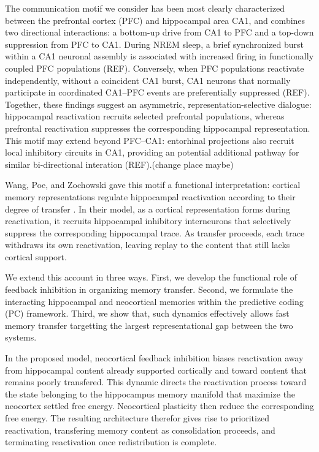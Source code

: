\documentclass[10pt,letterpaper]{article}
\theoremstyle{plain}
\theoremstyle{remark}
\begin{document}
The communication motif we consider has been most clearly characterized between the prefrontal cortex (PFC) and hippocampal area CA1, and combines two directional interactions: a bottom-up drive from CA1 to PFC and a top-down suppression from PFC to CA1. During NREM sleep, a brief synchronized burst within a CA1 neuronal assembly is associated with increased firing in functionally coupled PFC populations (REF). Conversely, when PFC populations reactivate independently, without a coincident CA1 burst, CA1 neurons that normally participate in coordinated CA1–PFC events are preferentially suppressed (REF). Together, these findings suggest an asymmetric, representation-selective dialogue: hippocampal reactivation recruits selected prefrontal populations, whereas prefrontal reactivation suppresses the corresponding hippocampal representation. This motif may extend beyond PFC–CA1: entorhinal projections also recruit local inhibitory circuits in CA1, providing an potential additional pathway for similar bi-directional interation (REF).(change place maybe)

Wang, Poe, and Zochowski gave this motif a functional interpretation: cortical memory representations regulate hippocampal reactivation according to their degree of transfer \cite{wang2008heterogeneities}. In their model, as a cortical representation forms during reactivation, it recruits hippocampal inhibitory interneurons that selectively suppress the corresponding hippocampal trace. As transfer proceeds, each trace withdraws its own reactivation, leaving replay to the content that still lacks cortical support.

We extend this account in three ways. First, we develop the functional role of feedback inhibition in organizing memory transfer. Second, we formulate the interacting hippocampal and neocortical memories within the predictive coding (PC) framework. Third, we show that, such dynamics effectively allows fast memory transfer targetting the largest representational gap between the two systems.

In the proposed model, neocortical feedback inhibition biases reactivation away from hippocampal content already supported cortically and toward content that remains poorly transfered. This dynamic directs the reactivation process toward the state belonging to the hippocampus memory manifold that maximize the neocortex settled free energy. Neocortical plasticity then reduce the corresponding free energy. The resulting architecture therefor gives rise to prioritized reactivation, transfering memory content as consolidation proceeds, and terminating reactivation once redistribution is complete.
\end{document}
